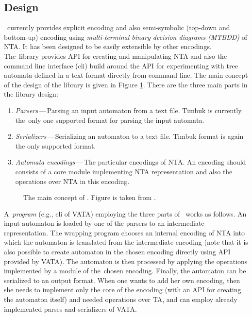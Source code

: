 \subsection{Design}
\Vata\ currently provides explicit encoding and also semi-symbolic (top-down and bottom-up)
encoding using \emph{multi-terminal binary decision diagrams (MTBDD)} of NTA.
It has been designed to be easily extensible by other encodings.
The~library provides API for creating and manipulating NTA and also the command line interface (cli) build around
the API for experimenting with tree automata defined in a text format directly from command line.
The main concept of the design of the library is given in Figure \ref{fig:vata}.
There are the three main parts in the library design:
\begin{enumerate}
	\item \emph{Parsers}\,---\,Parsing an input automaton from a text file.
		Timbuk \cite{timbuk} is currently the~only one supported format for parsing the input automata.
	\item \emph{Serializers}\,---\,Serializing an automaton to a text file.
		Timbuk format is again the only supported format.
	\item \emph{Automata encodings}\,---\,The particular encodings of NTA.
		An encoding should consists of a core module implementing NTA representation
		and also the operations over NTA in this encoding.
\end{enumerate}

\begin{figure}[bt]
\begin{center}

		\caption{The main concept of \vata. Figure is taken from \cite{libvata}.}
		\label{fig:vata}
\end{center}
\end{figure}

A~\emph{program} (e.g., cli of VATA) employing the three parts of \vata\ works as follows.
An input automaton is loaded by one of the parsers to an intermediate representation.
The wrapping program chooses an internal encoding of NTA into which the automaton is
translated from the intermediate encoding (note that it is also
possible to create automaton in the chosen encoding directly using API provided by VATA).
The automaton is then processed by applying the operations implemented by a module of the~chosen encoding.
Finally, the automaton can be serialized to an output format.
When one wants to add her own encoding,
then she needs to implement only the core of the encoding (with an API for creating the automaton itself)
and needed operations over TA, and can employ already implemented parses and serializers of VATA.


